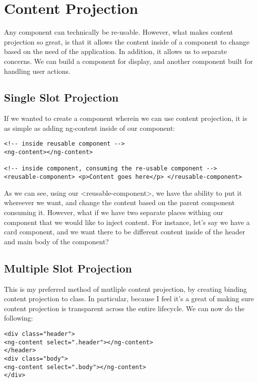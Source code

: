\section{ Content Projection }
\maketitle{}

Any component can technically be re-usable. However, what makes content
projection so great, is that it allows the content inside of a component to
change based on the need of the application. In addition, it allows us to
separate concerns. We can build a component for display, and another component
built for handling user actions.

\subsection{ Single Slot Projection }
If we wanted to create a component wherein we can use content projection, it is
as simple as adding ng-content inside of our component:
\begin{lstlisting}
<!-- inside reusable component -->
<ng-content></ng-content>

<!-- inside component, consuming the re-usable component -->
<reusable-component> <p>Content goes here</p> </reusable-component>
\end{lstlisting}

As we can see, using our <reusable-component>, we have the ability to put it
whereever we want, and change the content based on the parent component
consuming it. However, what if we have two separate places withing our
component that we would like to inject content. For instance, let's say we have
a card component, and we want there to be different content inside of the header
and main body of the component?

\subsection{ Multiple Slot Projection }
This is my preferred method of mutliple content projection, by creating binding
content projection to class. In particular, because I feel it's a great of
making sure content projection is transparent across the entire lifecycle. We
can now do the following:

\begin{lstlisting}
<div class="header">
<ng-content select=".header"></ng-content>
</header>
<div class="body">
<ng-content select=".body"></ng-content>
</div>
\end{lstlisting}

